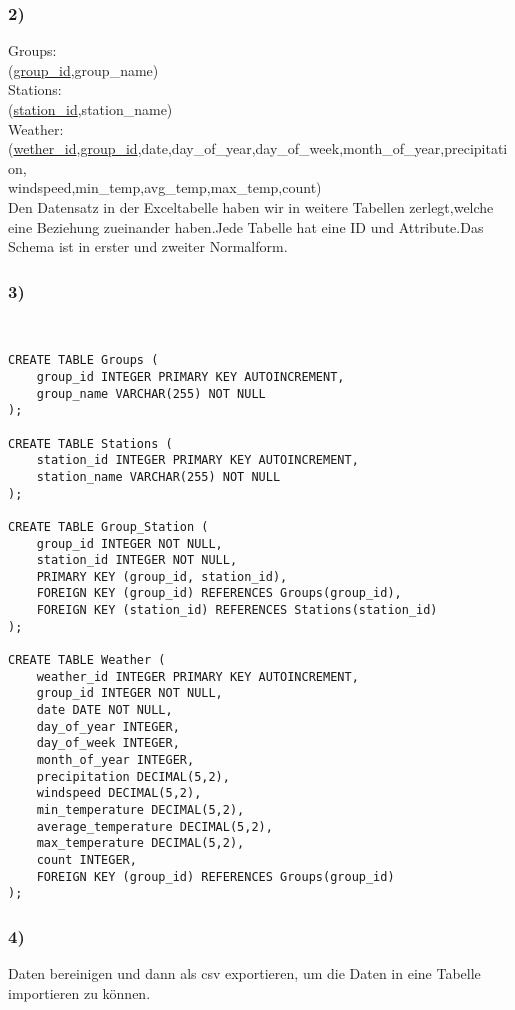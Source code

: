 \documentclass[12pt,a4paper]{article}
\begin{document}
\subsubsection{2)}
Groups:\\
(\ul{group\_id},group\_name)\\
Stations:\\
(\ul{station\_id},station\_name)\\
Weather:\\
(\ul{wether\_id},\ul{group\_id},date,day\_of\_year,day\_of\_week,month\_of\_year,precipitation,\\windspeed,min\_temp,avg\_temp,max\_temp,count)\\

Den Datensatz in der Exceltabelle haben wir in weitere Tabellen zerlegt,welche eine Beziehung zueinander haben.Jede Tabelle hat eine ID und Attribute.Das Schema ist in erster und zweiter Normalform. 

\subsubsection{3)}
\begin{verbatim}
    

CREATE TABLE Groups (
    group_id INTEGER PRIMARY KEY AUTOINCREMENT,
    group_name VARCHAR(255) NOT NULL
);

CREATE TABLE Stations (
    station_id INTEGER PRIMARY KEY AUTOINCREMENT,
    station_name VARCHAR(255) NOT NULL
);

CREATE TABLE Group_Station (
    group_id INTEGER NOT NULL,
    station_id INTEGER NOT NULL,
    PRIMARY KEY (group_id, station_id),
    FOREIGN KEY (group_id) REFERENCES Groups(group_id),
    FOREIGN KEY (station_id) REFERENCES Stations(station_id)
);

CREATE TABLE Weather (
    weather_id INTEGER PRIMARY KEY AUTOINCREMENT,
    group_id INTEGER NOT NULL,
    date DATE NOT NULL,
    day_of_year INTEGER,
    day_of_week INTEGER,
    month_of_year INTEGER,
    precipitation DECIMAL(5,2),
    windspeed DECIMAL(5,2),
    min_temperature DECIMAL(5,2),
    average_temperature DECIMAL(5,2),
    max_temperature DECIMAL(5,2),
    count INTEGER,
    FOREIGN KEY (group_id) REFERENCES Groups(group_id)
);
\end{verbatim}

\subsubsection{4)}
Daten bereinigen und dann als csv exportieren, um die Daten in eine Tabelle importieren zu können.
\end{document}
